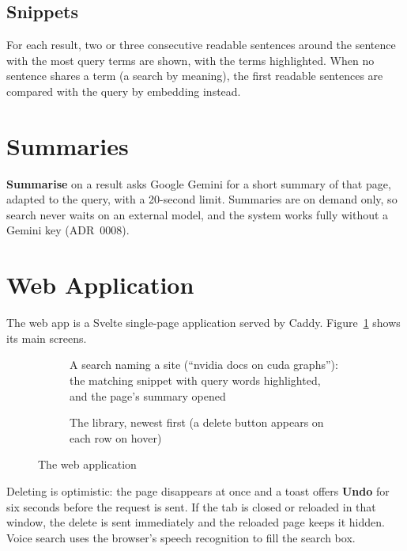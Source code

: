 \subsection{Snippets}

For each result, two or three consecutive readable sentences around the
sentence with the most query terms are shown, with the terms highlighted.
When no sentence shares a term (a search by meaning), the first readable
sentences are compared with the query by embedding instead.

\section{Summaries}

\textbf{Summarise} on a result asks Google Gemini \cite{gemini} for a short
summary of that page, adapted to the query, with a 20-second limit. Summaries
are on demand only, so search never waits on an external model, and the
system works fully without a Gemini key (ADR~0008).

\section{Web Application}

The web app is a Svelte \cite{svelte} single-page application served by
Caddy. Figure~\ref{fig:webapp} shows its main screens.

\begin{figure}[!htbp]
\centering
\begin{subfigure}[b]{\textwidth}
  \centering
  \caption{A search naming a site (``nvidia docs on cuda graphs''): the matching
  snippet with query words highlighted, and the page's summary opened}
\end{subfigure}

\vspace{4mm}
\begin{subfigure}[b]{\textwidth}
  \centering
  \caption{The library, newest first (a delete button appears on each row on hover)}
\end{subfigure}
\caption{The web application}
\label{fig:webapp}
\end{figure}

Deleting is optimistic: the page disappears at once and a toast offers
\textbf{Undo} for six seconds before the request is sent. If the tab is
closed or reloaded in that window, the delete is sent immediately and the
reloaded page keeps it hidden. Voice search uses the browser's speech
recognition to fill the search box.

